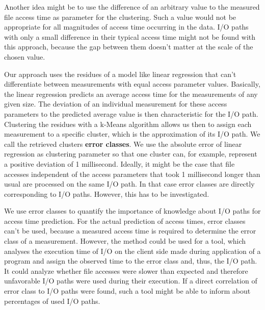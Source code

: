 \documentclass{superfri}
\begin{document}
	Another idea might be to use the difference of an arbitrary value to the measured file access time as parameter for the clustering. 
	Such a value would not be appropriate for all magnitudes of access time occurring in the data.
	I/O paths with only a small difference in their typical access time might not be found with this approach, because the gap between them doesn't matter at the scale of the chosen value.
	
	Our approach uses the residues of a model like linear regression that can't differentiate between measurements with equal access parameter values.
	Basically, the linear regression predicts an average access time for the measurements of any given size.
	The deviation of an individual measurement for these access parameters to the predicted average value is then characteristic for the I/O path.
	Clustering the residues with a k-Means algorithm allows us then to assign each measurement to a specific cluster, which is the approximation of its I/O path.
	We call the retrieved clusters \textbf{error classes}.
	We use the absolute error of linear regression as clustering parameter so that one cluster can, for example, represent a positive deviation of 1 millisecond.
	Ideally, it might be the case that file accesses independent of the access parameters that took 1 millisecond longer than usual are processed on the same I/O path.
	In that case error classes are directly corresponding to I/O paths. 
	However, this has to be investigated.
	
	\medskip
	
	We use error classes to quantify the importance of knowledge about I/O paths for access time prediction. 
	For the actual prediction of access times, error classes can't be used, because a measured access time is required to determine the error class of a measurement.
	However, the method could be used for a tool, which analyses the execution time of I/O on the client side made during application of a program and assign the observed time to the error class and, thus, the I/O path. 
	It could analyze whether file accesses were slower than expected and therefore unfavorable I/O paths were used during their execution.
	If a direct correlation of error class to I/O paths were found, such a tool might be able to inform about percentages of used I/O paths.
	
\end{document}
